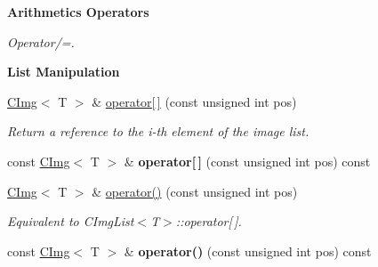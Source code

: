 \begin{Indent}{\bf Arithmetics Operators}
\begin{DoxyCompactItemize}
\begin{DoxyCompactList}\small\item\em Operator/=. \item\end{DoxyCompactList}\end{DoxyCompactItemize}
\end{Indent}
\begin{Indent}{\bf List Manipulation}\par
{\em \label{_amgrpd0c99fdbff20276dd1304738a84fd9c3}
 }\begin{DoxyCompactItemize}
\item 
\hypertarget{structcimg__library_1_1_c_img_list_a8c2ba62382cab9cdf2adcd46206fbdf0}{
\hyperlink{structcimg__library_1_1_c_img}{CImg}$<$ T $>$ \& \hyperlink{structcimg__library_1_1_c_img_list_a8c2ba62382cab9cdf2adcd46206fbdf0}{operator\mbox{[}$\,$\mbox{]}} (const unsigned int pos)}
\label{structcimg__library_1_1_c_img_list_a8c2ba62382cab9cdf2adcd46206fbdf0}

\begin{DoxyCompactList}\small\item\em Return a reference to the i-\/th element of the image list. \item\end{DoxyCompactList}\item 
\hypertarget{structcimg__library_1_1_c_img_list_a92d8ccdbcc25c9e0f90535f279a7ba77}{
const \hyperlink{structcimg__library_1_1_c_img}{CImg}$<$ T $>$ \& {\bfseries operator\mbox{[}$\,$\mbox{]}} (const unsigned int pos) const }
\label{structcimg__library_1_1_c_img_list_a92d8ccdbcc25c9e0f90535f279a7ba77}

\item 
\hypertarget{structcimg__library_1_1_c_img_list_a93bd324f0a8532e94c78bef4976b7700}{
\hyperlink{structcimg__library_1_1_c_img}{CImg}$<$ T $>$ \& \hyperlink{structcimg__library_1_1_c_img_list_a93bd324f0a8532e94c78bef4976b7700}{operator()} (const unsigned int pos)}
\label{structcimg__library_1_1_c_img_list_a93bd324f0a8532e94c78bef4976b7700}

\begin{DoxyCompactList}\small\item\em Equivalent to CImgList$<$T$>$::operator\mbox{[}$\,$\mbox{]}. \item\end{DoxyCompactList}\item 
\hypertarget{structcimg__library_1_1_c_img_list_ad170096b45d6ea2c254a09bdbafd43d8}{
const \hyperlink{structcimg__library_1_1_c_img}{CImg}$<$ T $>$ \& {\bfseries operator()} (const unsigned int pos) const }
\label{structcimg__library_1_1_c_img_list_ad170096b45d6ea2c254a09bdbafd43d8}


\end{DoxyCompactItemize}
\end{Indent}
